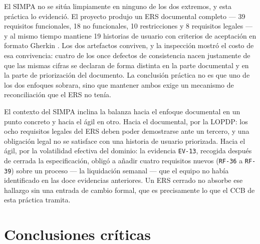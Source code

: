 \documentclass[11pt,letterpaper]{article}
\begin{document}
El SIMPA no se sitúa limpiamente en ninguno de los dos extremos, y esta práctica lo evidenció. El
proyecto produjo un ERS documental completo --- 39 requisitos funcionales, 18 no funcionales, 10
restricciones y 8 requisitos legales --- y al mismo tiempo mantiene 19 historias de usuario con
criterios de aceptación en formato Gherkin \cite{smart2014}. Los dos artefactos conviven, y la
inspección mostró el costo de esa convivencia: cuatro de los once defectos de consistencia nacen
justamente de que las mismas cifras se declaran de forma distinta en la parte documental y en la
parte de priorización del documento. La conclusión práctica no es que uno de los dos enfoques
sobrara, sino que mantener ambos exige un mecanismo de reconciliación que el ERS no tenía.

El contexto del SIMPA inclina la balanza hacia el enfoque documental en un punto concreto y hacia
el ágil en otro. Hacia el documental, por la LOPDP: los ocho requisitos legales del ERS deben poder
demostrarse ante un tercero, y una obligación legal no se satisface con una historia de usuario
priorizada. Hacia el ágil, por la volatilidad efectiva del dominio: la evidencia \texttt{EV-13},
recogida después de cerrada la especificación, obligó a añadir cuatro requisitos nuevos
(\texttt{RF-36} a \texttt{RF-39}) sobre un proceso --- la liquidación semanal --- que el equipo no
había identificado en las doce evidencias anteriores. Un ERS cerrado no absorbe ese hallazgo sin
una entrada de cambio formal, que es precisamente lo que el CCB de esta práctica tramita.

\section{Conclusiones críticas}
\end{document}

